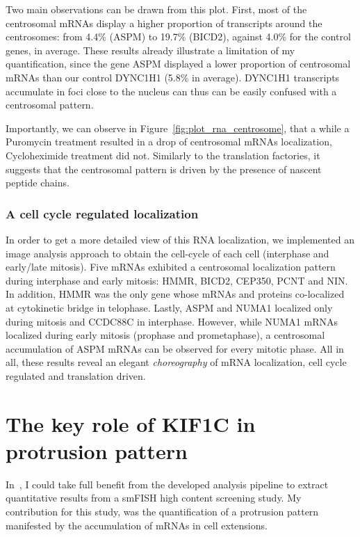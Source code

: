 Two main observations can be drawn from this plot.
First, most of the centrosomal \ac{mRNA}s display a higher proportion of transcripts around the centrosomes: from 4.4\% (ASPM) to 19.7\% (BICD2), against 4.0\% for the control genes, in average.
These results already illustrate a limitation of my quantification, since the gene ASPM displayed a lower proportion of centrosomal \ac{mRNA}s than our control DYNC1H1 (5.8\% in average).
DYNC1H1 transcripts accumulate in foci close to the nucleus can thus can be easily confused with a centrosomal pattern.

Importantly, we can observe in Figure~\ref{fig:plot_rna_centrosome}, that a while a Puromycin treatment resulted in a drop of centrosomal \ac{mRNA}s localization, Cycloheximide treatment did not.
Similarly to the translation factories, it suggests that the centrosomal pattern is driven by the presence of nascent peptide chains.

\subsubsection{A cell cycle regulated localization}

In order to get a more detailed view of this RNA localization, we implemented an image analysis approach to obtain the cell-cycle of each cell (interphase and early/late mitosis).
Five \ac{mRNA}s exhibited a centrosomal localization pattern during interphase and early mitosis: HMMR, BICD2, CEP350, PCNT and NIN.
In addition, HMMR was the only gene whose \ac{mRNA}s and proteins co-localized at cytokinetic bridge in telophase.
Lastly, ASPM and NUMA1 localized only during mitosis and CCDC88C in interphase.
However, while NUMA1 \ac{mRNA}s localized during early mitosis (prophase and prometaphase), a centrosomal accumulation of ASPM \ac{mRNA}s can be observed for every mitotic phase.
All in all, these results reveal an elegant \emph{choreography} of \ac{mRNA} localization, cell cycle regulated and translation driven.

\section{The key role of KIF1C in protrusion pattern}
\label{sec:protrusion}

In~\cite{pichon_kinesin_2021}, I could take full benefit from the developed analysis pipeline to extract quantitative results from a \ac{smFISH} high content screening study.
My contribution for this study, was the quantification of a protrusion pattern manifested by the accumulation of \ac{mRNA}s in cell extensions.


